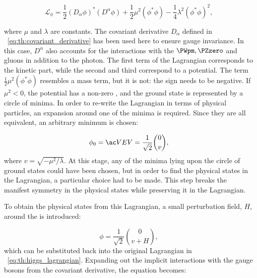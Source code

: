 \begin{equation}
\label{eq:th:higgs_lagrangian}
\mathcal{L}_{\phi} = \frac{1}{2}(D_{\alpha} \phi)^{*} (D^{\alpha} \phi) + \frac{1}{2} \mu^{2} (\phi^{*} \phi) - \frac{1}{4} \lambda^{2} (\phi^{*} \phi) ^{2} ,
\end{equation}

where $\mu$ and $\lambda$ are constants. The covariant derivative $D_{\alpha}$ defined in \Eq~\ref{eq:th:covariant_derivative} has been used here to ensure gauge invariance. In this case, $D^{\alpha}$ also accounts for the interactions with the $\PWpm, \PZzero$ and gluons in addition to the photon.
The first term of the Lagrangian corresponds to the kinetic part, while the second and third correspond to a potential. %
The term $ \frac{1}{2} \mu^{2} (\phi^{*} \phi)$ resembles a mass term, but it is not: the sign needs to be negative. If $\mu^{2}<0$, the potential has a non-zero \VEV, and the ground state is represented by a circle of minima. In order to re-write the Lagrangian in terms of physical particles, an expansion around one of the minima is required. Since they are all equivalent, an arbitrary minimum is chosen:

\begin{equation}
\label{eq:th:higgs_vev}
\phi_{0} = \VEV = \frac{1}{\sqrt{2}} \binom{0}{v} ,
\end{equation}
where $v=\sqrt{- \mu^{2} / \lambda}$. At this stage, any of the minima lying upon the circle of ground states could have been chosen, but in order to find the physical states in the Lagrangian, a particular choice had to be made. This step breaks the manifest symmetry in the physical states while preserving it in the Lagrangian. 

To obtain the physical states from this Lagrangian, a small perturbation field, $H$, around the \VEV is introduced: 

\begin{equation}
\label{eq:th:higgs_vev_perturbation}
\phi = \frac{1}{\sqrt{2}} \binom{0}{v+H} ,
\end{equation}
which can be substituted back into the original Lagrangian in \Eq~\ref{eq:th:higgs_lagrangian}. Expanding out the implicit interactions with the gauge bosons from the covariant derivative, the equation becomes:

